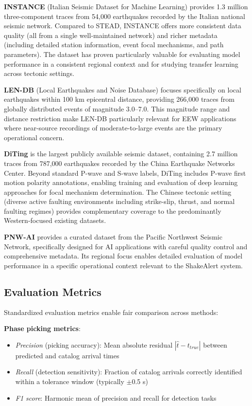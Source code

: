 \documentclass[review,authoryear]{elsarticle}
\begin{document}
\textbf{INSTANCE} (Italian Seismic Dataset for Machine Learning) \citep{michelini2021instance} provides 1.3 million three-component traces from 54,000 earthquakes recorded by the Italian national seismic network. Compared to STEAD, INSTANCE offers more consistent data quality (all from a single well-maintained network) and richer metadata (including detailed station information, event focal mechanisms, and path parameters). The dataset has proven particularly valuable for evaluating model performance in a consistent regional context and for studying transfer learning across tectonic settings.

\textbf{LEN-DB} (Local Earthquakes and Noise Database) \citep{magrini2020lendb} focuses specifically on local earthquakes within 100 km epicentral distance, providing 266,000 traces from globally distributed events of magnitude 3.0--7.0. This magnitude range and distance restriction make LEN-DB particularly relevant for EEW applications where near-source recordings of moderate-to-large events are the primary operational concern.

\textbf{DiTing} \citep{zhao2023diting} is the largest publicly available seismic dataset, containing 2.7 million traces from 787,000 earthquakes recorded by the China Earthquake Networks Center. Beyond standard P-wave and S-wave labels, DiTing includes P-wave first motion polarity annotations, enabling training and evaluation of deep learning approaches for focal mechanism determination. The Chinese tectonic setting (diverse active faulting environments including strike-slip, thrust, and normal faulting regimes) provides complementary coverage to the predominantly Western-focused existing datasets.

\textbf{PNW-AI} \citep{ni2023deep} provides a curated dataset from the Pacific Northwest Seismic Network, specifically designed for AI applications with careful quality control and comprehensive metadata. Its regional focus enables detailed evaluation of model performance in a specific operational context relevant to the ShakeAlert system.

\subsection{Evaluation Metrics}

Standardized evaluation metrics enable fair comparison across methods:

\textbf{Phase picking metrics}:
\begin{itemize}
\item \textit{Precision} (picking accuracy): Mean absolute residual $|\hat{t} - t_{true}|$ between predicted and catalog arrival times
\item \textit{Recall} (detection sensitivity): Fraction of catalog arrivals correctly identified within a tolerance window (typically $\pm$0.5 s)
\item \textit{F1 score}: Harmonic mean of precision and recall for detection tasks
\end{itemize}
\end{document}
